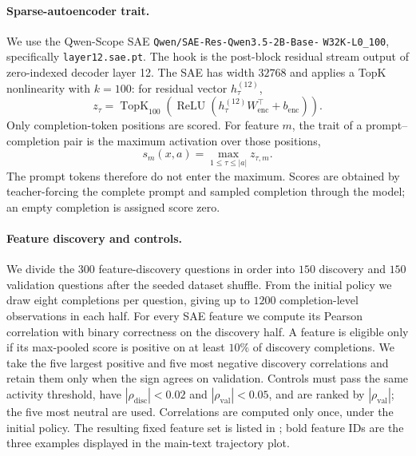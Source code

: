 \paragraph{Sparse-autoencoder trait.}
We use the Qwen-Scope SAE
\texttt{Qwen/SAE-Res-}\allowbreak\texttt{Qwen3.5-2B-Base-}\allowbreak%
\texttt{W32K-L0\_100}, specifically
\texttt{layer12.sae.pt}.  The hook is the post-block residual stream output
of zero-indexed decoder layer 12.  The SAE has width $32768$ and applies a
TopK nonlinearity with $k=100$: for residual vector $h_\tau^{(12)}$,
\begin{equation*}
z_\tau
=
\operatorname{TopK}_{100}\!\left(
\operatorname{ReLU}\!\left(h_\tau^{(12)}W_{\mathrm{enc}}^\top
+b_{\mathrm{enc}}\right)\right).
\end{equation*}
Only completion-token positions are scored.  For feature $m$, the trait of a
prompt--completion pair is the maximum activation over those positions,
\begin{equation*}
s_m(x,a)=\max_{1\leq \tau\leq |a|}z_{\tau,m}.
\end{equation*}
The prompt tokens therefore do not enter the maximum.  Scores are obtained by
teacher-forcing the complete prompt and sampled completion through the model;
an empty completion is assigned score zero.

\paragraph{Feature discovery and controls.}
We divide the $300$ feature-discovery questions in order into $150$ discovery
and $150$ validation questions after the seeded dataset shuffle.  From the
initial policy we draw eight completions per question, giving up to $1200$
completion-level observations in each half.  For every SAE feature we compute
its Pearson correlation with binary correctness on the discovery half.
A feature is eligible only if its max-pooled score is positive on at least
$10\%$ of discovery completions.  We take the five largest positive and five
most negative discovery correlations and retain them only when the sign
agrees on validation.  Controls must pass the same activity threshold, have
$|\rho_{\mathrm{disc}}|<0.02$ and
$|\rho_{\mathrm{val}}|<0.05$, and are ranked by
$|\rho_{\mathrm{val}}|$; the five most neutral are used.  Correlations are
computed only once, under the initial policy.  The resulting fixed feature
set is listed in ; bold feature IDs are the
three examples displayed in the main-text trajectory plot.

